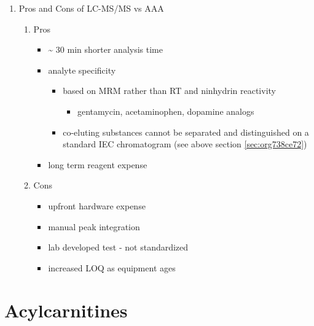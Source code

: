 \documentclass{scrartcl}
\begin{document}
\begin{enumerate}
\item Pros and Cons of LC-MS/MS vs AAA
\label{sec:org10a55a7}
\begin{enumerate}
\item Pros
\label{sec:orgb76627e}
\begin{itemize}
\item \textasciitilde{} 30 min shorter analysis time
\item analyte specificity
\begin{itemize}
\item based on MRM rather than RT and ninhydrin reactivity
\begin{itemize}
\item gentamycin, acetaminophen, dopamine analogs
\end{itemize}
\item co-eluting substances cannot be separated and distinguished on a
standard IEC chromatogram (see above section \ref{sec:org738ce72})
\end{itemize}
\item long term reagent expense
\end{itemize}

\item Cons
\label{sec:org7f06b15}
\begin{itemize}
\item upfront hardware expense
\item manual peak integration
\item lab developed test - not standardized
\item increased LOQ as equipment ages
\end{itemize}
\end{enumerate}
\end{enumerate}
\section{Acylcarnitines}
\label{sec:org94751bf}
\end{document}
